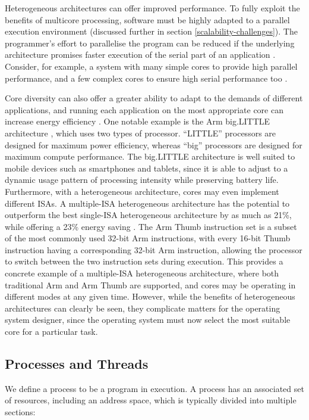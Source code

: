 \documentclass[bsc,frontabs,singlespacing,parskip,deptreport]{infthesis}
\begin{document}
Heterogeneous architectures can offer improved performance. To fully exploit the benefits of multicore processing, software must be highly adapted to a parallel execution environment (discussed further in section \ref{scalability-challenges}). The programmer's effort to parallelise the program can be reduced if the underlying architecture promises faster execution of the serial part of an application \cite{suleman_2007}. Consider, for example, a system with many simple cores to provide high parallel performance, and a few complex cores to ensure high serial performance too \cite{balakrishnan_2005}. 

Core diversity can also offer a greater ability to adapt to the demands of different applications, and running each application on the most appropriate core can increase energy efficiency \cite{kumar_2003}. One notable example is the Arm big.LITTLE architecture \cite{big.little}, which uses two types of processor. “LITTLE” processors are designed for maximum power efficiency, whereas “big” processors are designed for maximum compute performance. The big.LITTLE architecture is well suited to mobile devices such as smartphones and tablets, since it is able to adjust to a dynamic usage pattern of processing intensity while preserving battery life. Furthermore, with a heterogeneous architecture, cores may even implement different ISAs. A multiple-ISA heterogeneous architecture has the potential to outperform the best single-ISA heterogeneous architecture by as much as 21\%, while offering a 23\% energy saving \cite{venkat_2014}. The Arm Thumb instruction set is a subset of the most commonly used 32-bit Arm instructions, with every 16-bit Thumb instruction having a corresponding 32-bit Arm instruction, allowing the processor to switch between the two instruction sets during execution. This provides a concrete example of a multiple-ISA heterogeneous architecture, where both traditional Arm and Arm Thumb are supported, and cores may be operating in different modes at any given time. However, while the benefits of heterogeneous architectures can clearly be seen, they complicate matters for the operating system designer, since the operating system must now select the most suitable core for a particular task.

\subsection{Processes and Threads} 
\label{processes-threads}
We define a process to be a program in execution. A process has an associated set of resources, including an address space, which is typically divided into multiple sections:
\end{document}
